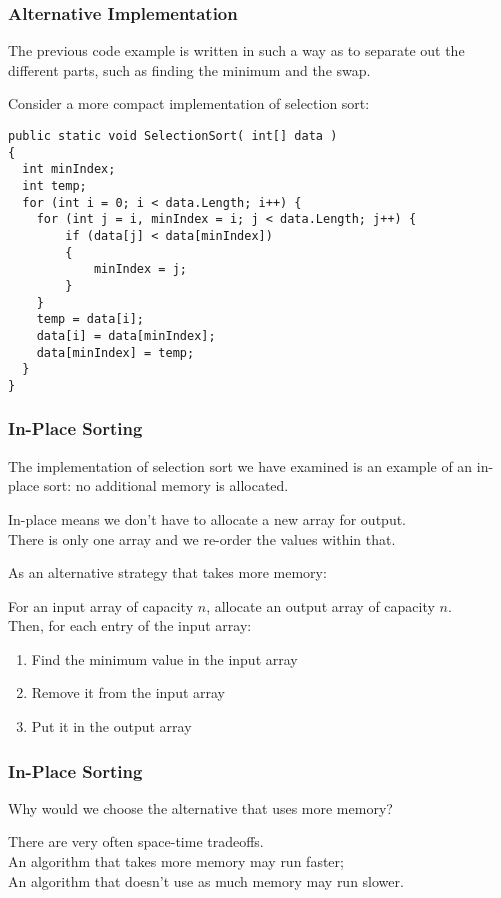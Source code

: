 \begin{frame}[fragile]
\frametitle{Alternative Implementation}
The previous code example is written in such a way as to separate out the different parts, such as finding the minimum and the swap.

Consider a more compact implementation of selection sort:
\vspace{-1em}
{\scriptsize
\begin{verbatim}
public static void SelectionSort( int[] data )
{
  int minIndex;
  int temp;
  for (int i = 0; i < data.Length; i++) {
    for (int j = i, minIndex = i; j < data.Length; j++) {
        if (data[j] < data[minIndex])
        {
            minIndex = j;
        }
    }
    temp = data[i];
    data[i] = data[minIndex];
    data[minIndex] = temp;
  }
}
\end{verbatim}
}

\end{frame}


\begin{frame}
\frametitle{In-Place Sorting}

The implementation of selection sort we have examined is an example of an \alert{in-place} sort: no additional memory is allocated.

In-place means we don't have to allocate a new array for output.\\
\quad There is only one array and we re-order the values within that.

As an alternative strategy that takes more memory: 

For an input array of capacity $n$, allocate an output array of capacity $n$.\\
Then, for each entry of the input array: 
\begin{enumerate}
\item Find the minimum value in the input array
\item Remove it from the input array
\item Put it in the output array
\end{enumerate}

\end{frame}

\begin{frame}
\frametitle{In-Place Sorting}

Why would we choose the alternative that uses more memory?

There are very often space-time tradeoffs.\\
\quad An algorithm that takes more memory may run faster; \\
\quad An algorithm that doesn't use as much memory may run slower.

\end{frame}




